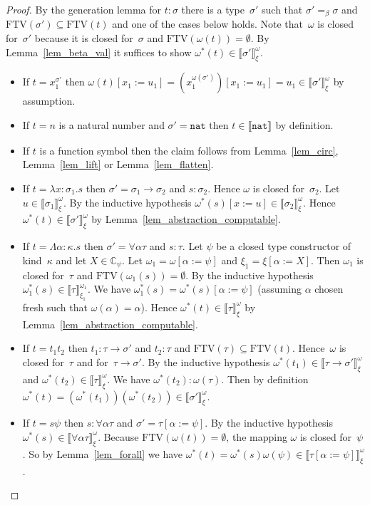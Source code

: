 \documentclass[a4paper,UKenglish,cleveref,autoref,numberwithinsect]{lipics-v2019}
\theoremstyle{definition}
\newcommand{\arrtype}{\rightarrow}
\newcommand{\subst}[2]{#1:=#2}
\newcommand{\abs}[2]{\lambda #1.#2}
\newcommand{\tabs}[2]{\Lambda #1.#2}
\newcommand{\nat}{\mathtt{nat}}
\newcommand{\FTV}{\mathrm{FTV}}
\newcommand{\Cb}{\mathbb{C}}
\newcommand{\val}[3]{\ensuremath{\llbracket#1\rrbracket_{#2}^{#3}}}
\begin{document}
\begin{proof}
  By the generation lemma for $t : \sigma$ there is a type~$\sigma'$
  such that $\sigma' =_\beta \sigma$ and $\FTV(\sigma') \subseteq
  \FTV(t)$ and one of the cases below holds. Note that~$\omega$ is
  closed for~$\sigma'$ because it is closed for~$\sigma$ and
  $\FTV(\omega(t)) = \emptyset$. By Lemma~\ref{lem_beta_val} it
  suffices to show $\omega^*(t) \in \val{\sigma'}{\xi}{\omega}$.
  \begin{itemize}
  \item If $t = x_1^{\sigma'}$ then $\omega(t)[\subst{x_1}{u_1}] =
    (x_1^{\omega(\sigma')})[\subst{x_1}{u_1}] = u_1 \in
    \val{\sigma'}{\xi}{\omega}$ by assumption.
  \item If $t = n$ is a natural number and $\sigma' = \nat$ then $t
    \in \val{\nat}{}{}$ by definition.
  \item If $t$ is a function symbol then the claim follows from
    Lemma~\ref{lem_circ}, Lemma~\ref{lem_lift} or
    Lemma~\ref{lem_flatten}.
  \item If $t = \abs{x:\sigma_1}{s}$ then
    $\sigma' = \sigma_1\arrtype\sigma_2$ and $s : \sigma_2$. Hence
    $\omega$ is closed for~$\sigma_2$. Let
    $u \in \val{\sigma_1}{\xi}{\omega}$. By the inductive hypothesis
    $\omega^*(s)[\subst{x}{u}] \in \val{\sigma_2}{\xi}{\omega}$. Hence
    $\omega^*(t) \in \val{\sigma'}{\xi}{\omega}$ by
    Lemma~\ref{lem_abstraction_computable}.
  \item If $t = \tabs{\alpha:\kappa}{s}$ then $\sigma' =
    \forall\alpha\tau$ and $s : \tau$. Let $\psi$ be a closed type
    constructor of kind~$\kappa$ and let $X \in \Cb_\psi$. Let
    $\omega_1 = \omega[\subst{\alpha}{\psi}]$ and
    $\xi_1=\xi[\subst{\alpha}{X}]$. Then $\omega_1$ is closed
    for~$\tau$ and $\FTV(\omega_1(s)) = \emptyset$. By the inductive
    hypothesis $\omega_1^*(s) \in \val{\tau}{\xi_1}{\omega_1}$. We
    have $\omega_1^*(s) = \omega^*(s)[\subst{\alpha}{\psi}]$ (assuming
    $\alpha$ chosen fresh such that $\omega(\alpha) = \alpha$). Hence
    $\omega^*(t) \in \val{\tau}{\xi}{\omega}$ by
    Lemma~\ref{lem_abstraction_computable}.
  \item If $t = t_1 t_2$ then $t_1 : \tau\arrtype\sigma'$ and $t_2 :
    \tau$ and $\FTV(\tau) \subseteq \FTV(t)$. Hence~$\omega$ is closed
    for~$\tau$ and for~$\tau\arrtype\sigma'$. By the inductive
    hypothesis $\omega^*(t_1) \in
    \val{\tau\arrtype\sigma'}{\xi}{\omega}$ and $\omega^*(t_2) \in
    \val{\tau}{\xi}{\omega}$. We have $\omega^*(t_2) :
    \omega(\tau)$. Then by definition $\omega^*(t) =
    (\omega^*(t_1))(\omega^*(t_2)) \in \val{\sigma'}{\xi}{\omega}$.
  \item If $t = s \psi$ then $s : \forall\alpha\tau$ and $\sigma' =
    \tau[\subst{\alpha}{\psi}]$. By the inductive hypothesis
    $\omega^*(s) \in \val{\forall\alpha\tau}{\xi}{\omega}$. Because
    $\FTV(\omega(t)) = \emptyset$, the mapping $\omega$ is closed
    for~$\psi$. So by Lemma~\ref{lem_forall} we have $\omega^*(t) =
    \omega^*(s) \omega(\psi) \in
    \val{\tau[\subst{\alpha}{\psi}]}{\xi}{\omega}$.\qedhere
  \end{itemize}
\end{proof}
\end{document}
